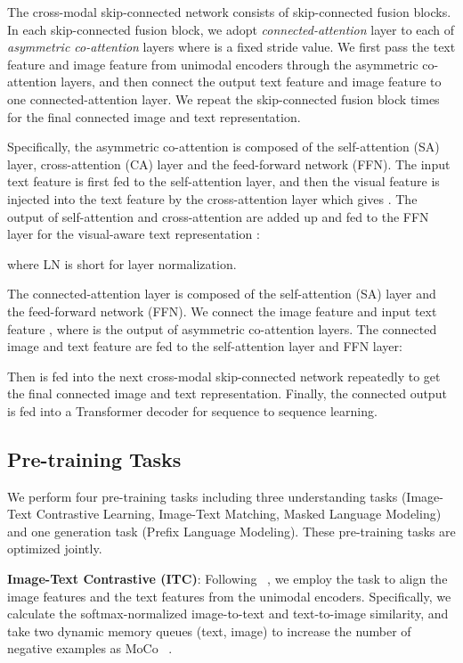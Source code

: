 \documentclass[11pt]{article}
\begin{document}
The cross-modal skip-connected network consists of  skip-connected fusion blocks. In each skip-connected fusion block, we adopt \textit{connected-attention} layer to each of  \textit{asymmetric co-attention} layers where  is a fixed stride value. We first pass the text feature and image feature from unimodal encoders through the  asymmetric co-attention layers, and then connect the output text feature and image feature to one connected-attention layer. We repeat the skip-connected fusion block  times for the final connected image and text representation.

Specifically, the asymmetric co-attention is composed of the self-attention (SA) layer, cross-attention (CA) layer and the feed-forward network (FFN). The input text feature  is first fed to the self-attention layer, and then the visual feature  is injected into the text feature  by the cross-attention layer which gives . The output of self-attention  and cross-attention  are added up and fed to the FFN layer for the visual-aware text representation :




where LN is short for layer normalization.

The connected-attention layer is composed of the self-attention (SA) layer and the feed-forward network (FFN). We connect the image feature  and input text feature , where  is the output of  asymmetric co-attention layers. The connected image and text feature  are fed to the self-attention layer and FFN layer:



Then  is fed into the next cross-modal skip-connected network repeatedly to get the final connected image and text representation. Finally, the connected output is fed into a Transformer decoder for sequence to sequence learning.

\subsection{Pre-training Tasks}
We perform four pre-training tasks including three understanding tasks (Image-Text Contrastive Learning, Image-Text Matching, Masked Language Modeling) and one generation task (Prefix Language Modeling). 
These pre-training tasks are optimized jointly.

\textbf{Image-Text Contrastive (ITC)}: Following ~\cite{li2021align}, we employ the task to align the image features and the text features from the unimodal encoders. Specifically, we calculate the softmax-normalized image-to-text and text-to-image similarity, and take two dynamic memory queues (text, image) to increase the number of negative examples as MoCo ~\cite{he2020momentum}.
\end{document}
